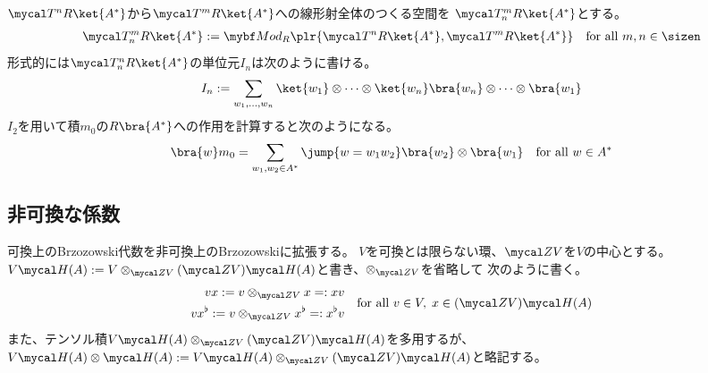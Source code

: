{	$\T^nR\ket{A^*}$から$\T^mR\ket{A^*}$への線形射全体のつくる空間を
	$\T^m_nR\ket{A^*}$とする。
	\begin{equation*}\begin{split}
		\T^m_nR\ket{A^*}:=\cat{Mod}_R\plr{\T^nR\ket{A^*},\T^mR\ket{A^*}}
		\quad\text{for all } m,n\in\sizen
	\end{split}\end{equation*}
	形式的には$\T_n^nR\ket{A^*}$の単位元$I_n$は次のように書ける。
	\begin{equation*}\begin{split}
		I_n := \sum_{w_1,\dots,w_n} \ket{w_1}\otimes\cdots\otimes\ket{w_n}
			\bra{w_n}\otimes\cdots\otimes\bra{w_1}
	\end{split}\end{equation*}
	$I_2$を用いて積$m_0$の$R\bra{A^*}$への作用を計算すると次のようになる。
	\begin{equation*}\begin{split}
		\bra{w}m_0 = \sum_{w_1,w_2\in A^*} \jump{w = w_1w_2}
			\bra{w_2}\otimes\bra{w_1} \quad\text{for all } w\in A^*
	\end{split}\end{equation*}
\subsection{非可換な係数}\label{s2:非可換な係数} %
	可換上のBrzozowski代数を非可換上のBrzozowskiに拡張する。
	$V$を可換とは限らない環、$\Z V$を$V$の中心とする。
	$V\Eta(A):=V\otimes_{\Z V}(\Z V)\Eta(A)$と書き、$\otimes_{\Z V}$を省略して
	次のように書く。
	\begin{equation*}\begin{split}
		vx := v\otimes_{\Z V}x =: xv \\
		vx^\flat := v\otimes_{\Z V}x^\flat =: x^\flat v 
	\end{split}
		\quad\text{for all } v\in V,\; x\in(\Z V)\Eta(A)
	\end{equation*}
	また、テンソル積$V\Eta(A)\otimes_{\Z V}(\Z V)\Eta(A)$を多用するが、
	$V\Eta(A)\otimes\Eta(A):=V\Eta(A)\otimes_{\Z V}(\Z V)\Eta(A)$と略記する。

}
